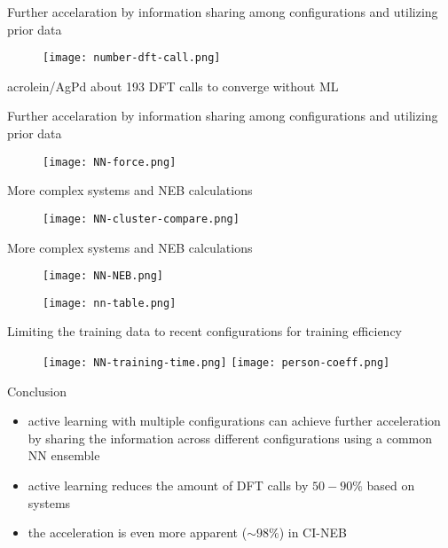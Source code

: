 \documentclass[xcolor=x11names,UTF8]{ctexbeamer}
\begin{document}
\begin{frame}{Further accelaration by information sharing among configurations and utilizing prior data}
  \begin{figure}
      \centering
      \texttt{[image: number-dft-call.png]}
  \end{figure}
 acrolein/AgPd  about 193 DFT calls to converge without ML

\end{frame}

\begin{frame}{Further accelaration by information sharing among configurations and utilizing prior data}
\begin{figure}
      \centering
      \texttt{[image: NN-force.png]}
  \end{figure}
\end{frame}

\begin{frame}{More complex systems and NEB calculations}
\begin{figure}
      \centering
      \texttt{[image: NN-cluster-compare.png]}
 \end{figure}
\end{frame}

\begin{frame}{More complex systems and NEB calculations}
\begin{figure}
      \centering
      \texttt{[image: NN-NEB.png]}
 \end{figure}

\begin{figure}
      \centering
      \texttt{[image: nn-table.png]}
 \end{figure}
\end{frame}

\begin{frame}{Limiting the training data to recent configurations for training efficiency}
\begin{figure}
      \texttt{[image: NN-training-time.png]}
      \texttt{[image: person-coeff.png]}
 \end{figure}

\end{frame}

\begin{frame}{Conclusion}
  \begin{itemize}
        \item active learning with multiple configurations can
        achieve further acceleration by sharing the information across different configurations using a common NN ensemble
        \item active learning reduces the amount of DFT calls by $50-90\%$ based on systems
        \item the acceleration is even more apparent ($∼98\%$)  in CI-NEB
    \end{itemize}
\end{frame}
\end{document}
